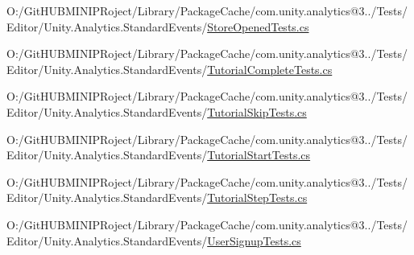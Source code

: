 \begin{DoxyCompactItemize}
O\+:/\+Git\+H\+U\+B\+M\+I\+N\+I\+P\+Roject/\+Library/\+Package\+Cache/com.\+unity.\+analytics@3../\+Tests/\+Editor/\+Unity.\+Analytics.\+Standard\+Events/\mbox{\hyperlink{_store_opened_tests_8cs}{Store\+Opened\+Tests.\+cs}}\item 
O\+:/\+Git\+H\+U\+B\+M\+I\+N\+I\+P\+Roject/\+Library/\+Package\+Cache/com.\+unity.\+analytics@3../\+Tests/\+Editor/\+Unity.\+Analytics.\+Standard\+Events/\mbox{\hyperlink{_tutorial_complete_tests_8cs}{Tutorial\+Complete\+Tests.\+cs}}\item 
O\+:/\+Git\+H\+U\+B\+M\+I\+N\+I\+P\+Roject/\+Library/\+Package\+Cache/com.\+unity.\+analytics@3../\+Tests/\+Editor/\+Unity.\+Analytics.\+Standard\+Events/\mbox{\hyperlink{_tutorial_skip_tests_8cs}{Tutorial\+Skip\+Tests.\+cs}}\item 
O\+:/\+Git\+H\+U\+B\+M\+I\+N\+I\+P\+Roject/\+Library/\+Package\+Cache/com.\+unity.\+analytics@3../\+Tests/\+Editor/\+Unity.\+Analytics.\+Standard\+Events/\mbox{\hyperlink{_tutorial_start_tests_8cs}{Tutorial\+Start\+Tests.\+cs}}\item 
O\+:/\+Git\+H\+U\+B\+M\+I\+N\+I\+P\+Roject/\+Library/\+Package\+Cache/com.\+unity.\+analytics@3../\+Tests/\+Editor/\+Unity.\+Analytics.\+Standard\+Events/\mbox{\hyperlink{_tutorial_step_tests_8cs}{Tutorial\+Step\+Tests.\+cs}}\item 
O\+:/\+Git\+H\+U\+B\+M\+I\+N\+I\+P\+Roject/\+Library/\+Package\+Cache/com.\+unity.\+analytics@3../\+Tests/\+Editor/\+Unity.\+Analytics.\+Standard\+Events/\mbox{\hyperlink{_user_signup_tests_8cs}{User\+Signup\+Tests.\+cs}}\end{DoxyCompactItemize}
